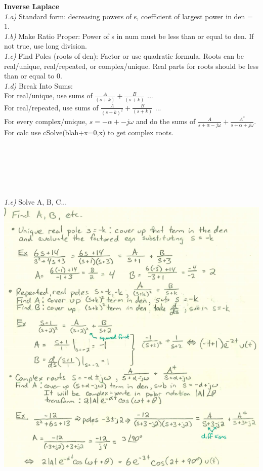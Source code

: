 \documentclass[10pt]{book}
\begin{document}
\begin{tcbposter}[
  poster = {%
    columns=3,
    rows=1,
    spacing=1mm,
  },
]
{	\textbf{Inverse Laplace}\\
\textit{1.a)} Standard form: decreasing powers of s, coefficient of largest power in den = 1. \\
\textit{1.b)} Make Ratio Proper: Power of s in num must be less than or equal to den. If not true, use long division. \\
\textit{1.c)} Find Poles (roots of den): Factor or use quadratic formula. Roots can be real/unique, real/repeated, or complex/unique. Real parts for roots should be less than or equal to 0. \\
\textit{1.d)} Break Into Sums: \\
For real/unique, use sums of $\frac{A}{(s+k)} + \frac{B}{(s+k)}$ ... \\
For real/repeated, use sums of $\frac{A}{(s+k)^2} + \frac{B}{(s+k)}$ ... \\
For every complex/unique, $s = - \alpha +- j \omega $  and do the sums of
$\frac{A}{s+ \alpha - j \omega} + \frac{A^*}{s+ \alpha + j \omega}$. For calc use 
cSolve(blah+x=0,x) to get complex roots.\\
\\
\\
\\
\\
\\
\\
\textit{1.e)} Solve A, B, C... \\
 \includegraphics[scale=0.314]{note1.png}\\
 
}
\end{tcbposter}
\end{document}
